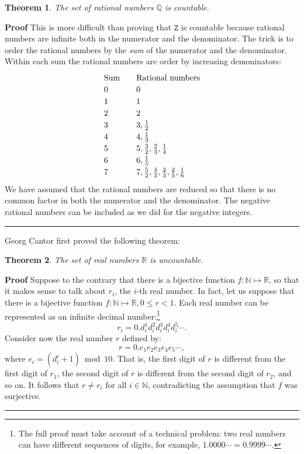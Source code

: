 \documentclass[12pt,a4paper]{article}
\newtheorem{theorem}{Theorem}
\newcommand*{\qed}{\hfill\rule[-2pt]{4pt}{10pt}}
\newenvironment{proof}{\textbf{Proof}}{\qed}
\begin{document}
\begin{theorem}
The set of rational numbers $\mathbb{Q}$ is countable.
\end{theorem}
\begin{proof}
This is more difficult than proving that $\mathtt{Z}$ is countable because rational numbers are infinite both in the numerator and the denominator. The trick is to order the rational numbers by the \emph{sum} of the numerator and the denominator. Within each sum the rational numbers are order by increasing demoninators:
\[
\renewcommand{\arraystretch}{1.2}
\begin{array}{l@{\hspace{2em}}l}
\textrm{Sum}&\textrm{Rational numbers}\\
0 & 0\\
1 & 1\\
2 & 2\\
3& 3, \frac{1}{2}\\
4& 4, \frac{1}{3}\\
5 & 5, \frac{3}{2},\frac{2}{3}, \frac{1}{4}\\
6 & 6, \frac{1}{5}\\
7 & 7, \frac{5}{2},\frac{4}{3},\frac{2}{3},\frac{2}{5},\frac{1}{6}
\end{array}
\]
We have assumed that the rational numbers are reduced so that there is no common factor in both the numerator and the denominator. The negative rational numbers can be included as we did for the negative integers.
\end{proof}

Georg Cantor first proved the following theorem:

\begin{theorem}
The set of real numbers $\mathbb{R}$ is uncountable.
\end{theorem}

\begin{proof}
Suppose to the contrary that there is a bijective function
$f:\mathbb{N}\mapsto \mathbb{R}$, so that it makes sense to talk about
$r_i$, the $i$-th real number. In fact, let us suppose that there is a bijective function $f:\mathbb{N}\mapsto \mathbb{R}, 0\leq r<1$. Each real number can be represented as an infinite decimal number:\footnote{The full proof must take account of a technical problem: two real numbers can have different sequences of digits, for example, $1.0000\cdots =0.9999\cdots$.}
\begin{displaymath}
r_i = 0.d_i^1 d_i^2 d_i^3 d_i^4 d_i^5 \cdots. 
\end{displaymath}
Consider now the real number $r$ defined by:
\begin{displaymath}
r = 0.e_1 e_2 e_3 e_4 e_5 \cdots, 
\end{displaymath}
where $e_i = (d_i^i + 1) \bmod 10$. That is, the first digit of $r$ is
different from the first digit of $r_1$, the second digit of $r$ is
different from the second digit of $r_2$, and so on. It follows that
$r\neq r_i$ for all $i\in \mathbb{N}$, contradicting the assumption
that $f$ was surjective. 
\end{proof}
\end{document}
